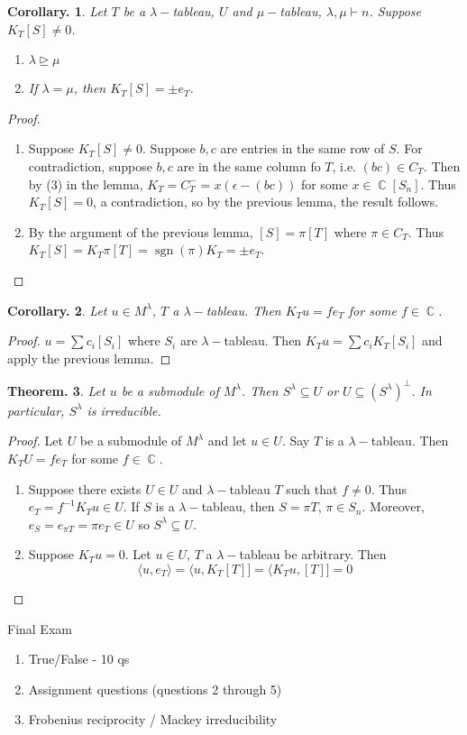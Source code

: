 \documentclass[11pt, a4paper]{memoir}
\DeclareMathOperator{\C}{{\mathbb{C}}}
\theoremstyle{change}
\newtheorem{theorem}{Theorem.}[section]
\newtheorem{corollary}[theorem]{Corollary.}
\theoremstyle{plain}
\theoremstyle{nonumberplain}
\newtheorem{proof}{Proof}
\DeclareMathOperator{\sgn}{sgn}
\numberwithin{equation}{section}
\begin{document}
\begin{corollary}
    Let $T$ be a $\lambda-$tableau, $U$ and $\mu-$tableau, $\lambda,\mu\vdash n$.
    Suppose $K_T[S]\neq 0$.
    \begin{enumerate}[nl]
        \item $\lambda\trianglerighteq\mu$
        \item If $\lambda=\mu$, then $K_T[S]=\pm e_T$.
    \end{enumerate}
\end{corollary}
\begin{proof}
    \begin{enumerate}[nl]
        \item Suppose $K_T[S]\neq 0$.
            Suppose $b,c$ are entries in the same row of $S$.
            For contradiction, suppose $b,c$ are in the same column fo $T$, i.e. $(bc)\in C_T$.
            Then by (3) in the lemma, $K_T=C_T^-=x(\epsilon-(bc))$ for some $x\in\C[S_n]$.
            Thus $K_T[S]=0$, a contradiction, so by the previous lemma, the result follows.
        \item By the argument of the previous lemma, $[S]=\pi[T]$ where $\pi\in C_T$.
            Thus $K_T[S]=K_T\pi[T]=\sgn(\pi) K_T=\pm e_T$.
    \end{enumerate}
\end{proof}
\begin{corollary}
    Let $u\in M^\lambda$, $T$ a $\lambda-$tableau.
    Then $K_Tu=fe_T$ for some $f\in\C$.
\end{corollary}
\begin{proof}
    $u=\sum c_i[S_i]$ where $S_i$ are $\lambda-$tableau.
    Then $K_Tu=\sum c_iK_T[S_i]$ and apply the previous lemma.
\end{proof}
\begin{theorem}
    Let $u$ be a submodule of $M^\lambda$.
    Then $S^\lambda\subseteq U$ or $U\subseteq (S^\lambda)^\perp$.
    In particular, $S^\lambda$ is irreducible.
\end{theorem}
\begin{proof}
    Let $U$ be a submodule of $M^\lambda$ and let $u\in U$.
    Say $T$ is a $\lambda-$tableau.
    Then $K_TU=fe_T$ for some $f\in\C$.
    \begin{enumerate}[nl]
        \item Suppose there exists $U\in U$ and $\lambda-$tableau $T$ such that $f\neq 0$.
            Thus $e_T=f^{-1}K_Tu\in U$.
            If $S$ is a $\lambda-$tableau, then $S=\pi T$, $\pi\in S_n$.
            Moreover, $e_S=e_{\pi T}=\pi e_T\in U$ so $S^\lambda\subseteq U$.
        \item Suppose $K_Tu=0$.
            Let $u\in U$, $T$ a $\lambda-$tableau be arbitrary.
            Then
            \begin{equation*}
                \langle u,e_T\rangle=\langle u,K_T[T]]=\langle K_Tu,[T]]=0
            \end{equation*}
    \end{enumerate}
\end{proof}

Final Exam
\begin{enumerate}[nl]
    \item True/False - 10 qs
    \item Assignment questions (questions 2 through 5)
    \item Frobenius reciprocity / Mackey irreducibility
\end{enumerate}
\end{document}
